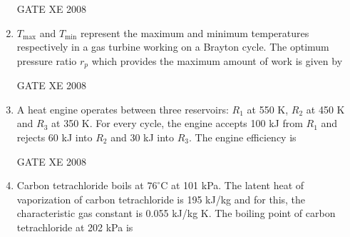 \documentclass[12pt]{article}
\begin{document}
\begin{enumerate}[label=Q\arabic*.]
 GATE XE 2008  

\item $T_{\max}$ and $T_{\min}$ represent the maximum and minimum temperatures respectively in a gas turbine working on a Brayton cycle. The optimum pressure ratio $r_p$ which provides the maximum amount of work is given by  

\begin{enumerate}[label=(\Alph*)]
\end{enumerate}


 GATE XE 2008  

\item A heat engine operates between three reservoirs: $R_1$ at 550 K, $R_2$ at 450 K and $R_3$ at 350 K. For every cycle, the engine accepts 100 kJ from $R_1$ and rejects 60 kJ into $R_2$ and 30 kJ into $R_3$. The engine efficiency is  

\begin{enumerate}[label=(\Alph*)]
 \end{enumerate}

 GATE XE 2008  

\item Carbon tetrachloride boils at $76^{\circ}$C at 101 kPa. The latent heat of vaporization of carbon tetrachloride is 195 kJ/kg and for this, the characteristic gas constant is 0.055 kJ/kg K. The boiling point of carbon tetrachloride at 202 kPa is 

\begin{enumerate}[label=(\Alph*)]
 \end{enumerate}


\end{enumerate}
\end{document}

